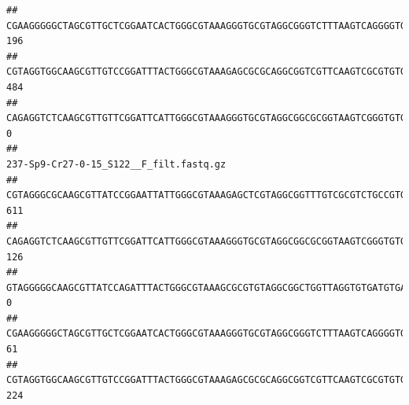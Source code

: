 \documentclass[]{article}
\begin{document}
\begin{verbatim}
## CGAAGGGGGCTAGCGTTGCTCGGAATCACTGGGCGTAAAGGGTGCGTAGGCGGGTCTTTAAGTCAGGGGTGAAATCCTGGAGCTCAACTCCAGAACTGCCTTTGATACTGAAGATCTTGAGTTCGGGAGAGGTGAGTGGAACTGCGAGTGTAGAGGTGAAATTCGTAGATATTCGCAAGAACACCAGTGGCGAAGGCGGCTCACTGGCCCGATACTGACGCTGAGGCACGAAAGCGTGGGGAGCAAACA                                     196
## CGTAGGTGGCAAGCGTTGTCCGGATTTACTGGGCGTAAAGAGCGCGCAGGCGGTCGTTCAAGTCGCGTGTGAAAGCCCCCGGCTCAACTGGGGAGGGTCACGCGATACTGATCGACTCGAAGGCAGGAGAGGGTAGTGGAATTCCCGGTGTAGTGGTGAAATGCGTAGATATCGGGAGGAACACCAGTGGCGAAGGCGACTACCTGGCCTGTTCTTGACGCTGAGGCGCGAAAGCTAGGGGAGCAAACG                                     484
## CAGAGGTCTCAAGCGTTGTTCGGATTCATTGGGCGTAAAGGGTGCGTAGGCGGCGCGGTAAGTCGGGTGTGAAATCTCGGGGCTTAACTCCGAAACTGCATTCGATACTGCCGTGCTTGAGGACTGGAGAGGAGACTGGAATTTACGGTGTAGCGGTGAAATGCGTAGATATCGTAAGGAAGACCAGTGGCGAAGGCGGGTCTCTGGACAGTTCCTGACGCTGAGGCACGAAGGCCAGGGGAGCAAACG                                       0
##                                                                                                                                                                                                                                                           237-Sp9-Cr27-0-15_S122__F_filt.fastq.gz
## CGTAGGGCGCAAGCGTTATCCGGAATTATTGGGCGTAAAGAGCTCGTAGGCGGTTTGTCGCGTCTGCCGTGAAAGTCCGGGGCTCAACTCCGGATCTGCGGTGGGTACGGGCAGACTAGAGTGATGTAGGGGAGACTGGAATTCCTGGTGTAGCGGTGAAATGCGCAGATATCAGGAGGAACACCGATGGCGAAGGCAGGTCTCTGGGCATTAACTGACGCTGAGGAGCGAAAGCATGGGGAGCGAACA                                     611
## CAGAGGTCTCAAGCGTTGTTCGGATTCATTGGGCGTAAAGGGTGCGTAGGCGGCGCGGTAAGTCGGGTGTGAAATCTCGGAGCTTAACTCCGAAACTGCATTCGATACTGCCGTGCTTGAGGACTGGAGAGGAGACTGGAATTTACGGTGTAGCGGTGAAATGCGTAGATATCGTAAGGAAGACCAGTGGCGAAGGCGGGTCTCTGGACAGTTCCTGACGCTGAGGCACGAAGGCCAGGGGAGCAAACG                                     126
## GTAGGGGGCAAGCGTTATCCAGATTTACTGGGCGTAAAGCGCGTGTAGGCGGCTGGTTAGGTGTGATGTGAAATCTTCCGGCTCAACCGGAAAACTGCATTGCAAACCGGCCTGGCTAGAGTGCAGGAGAGGGAAGCGGAATTCCAGGTGTAGCGGTGAAATGCGTAGATATCTGGAGGAACACCAGTGGCGAAGGCGGCTTCCTGGCCTGCAACTGACGCTGAGACGCGAAAGCGTGGGGAGCGAAC                                        0
## CGAAGGGGGCTAGCGTTGCTCGGAATCACTGGGCGTAAAGGGTGCGTAGGCGGGTCTTTAAGTCAGGGGTGAAATCCTGGAGCTCAACTCCAGAACTGCCTTTGATACTGAAGATCTTGAGTTCGGGAGAGGTGAGTGGAACTGCGAGTGTAGAGGTGAAATTCGTAGATATTCGCAAGAACACCAGTGGCGAAGGCGGCTCACTGGCCCGATACTGACGCTGAGGCACGAAAGCGTGGGGAGCAAACA                                      61
## CGTAGGTGGCAAGCGTTGTCCGGATTTACTGGGCGTAAAGAGCGCGCAGGCGGTCGTTCAAGTCGCGTGTGAAAGCCCCCGGCTCAACTGGGGAGGGTCACGCGATACTGATCGACTCGAAGGCAGGAGAGGGTAGTGGAATTCCCGGTGTAGTGGTGAAATGCGTAGATATCGGGAGGAACACCAGTGGCGAAGGCGACTACCTGGCCTGTTCTTGACGCTGAGGCGCGAAAGCTAGGGGAGCAAACG                                     224

\end{verbatim}
\end{document}
